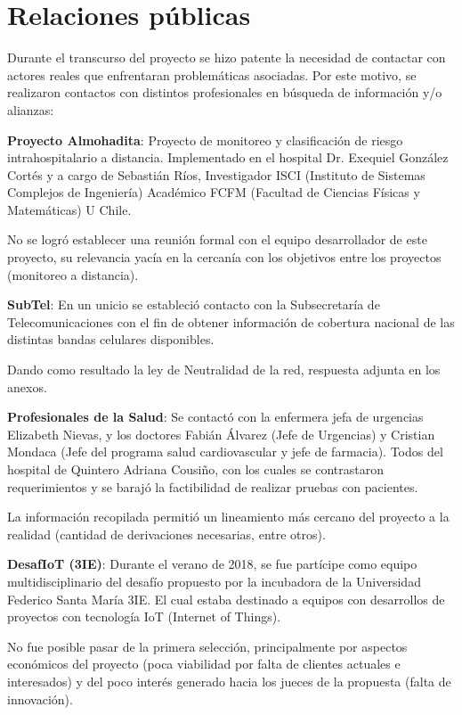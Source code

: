 \section{Relaciones públicas}

Durante el transcurso del proyecto se hizo patente la necesidad de contactar con actores reales que enfrentaran problemáticas asociadas. Por este motivo, se realizaron contactos con distintos profesionales en búsqueda de información y/o alianzas:

\textbf{Proyecto Almohadita}: Proyecto de monitoreo y clasificación de riesgo intrahospitalario a distancia. Implementado en el hospital Dr. Exequiel González Cortés y a cargo de Sebastián Ríos, Investigador ISCI (Instituto de Sistemas Complejos de Ingeniería) Académico FCFM (Facultad de Ciencias Físicas y Matemáticas) U Chile. 

No se logró establecer una reunión formal con el equipo desarrollador de este proyecto, su relevancia yacía en la cercanía con los objetivos entre los proyectos (monitoreo a distancia).

\textbf{SubTel}: En un unicio se estableció contacto con la Subsecretaría de Telecomunicaciones con el fin de obtener información de cobertura nacional de las distintas bandas celulares disponibles. 

Dando como resultado la ley de Neutralidad de la red, respuesta adjunta en los anexos.

\textbf{Profesionales de la Salud}: Se contactó con la enfermera jefa de urgencias Elizabeth Nievas, y los doctores Fabián Álvarez (Jefe de Urgencias) y Cristian Mondaca (Jefe del programa salud cardiovascular y jefe de farmacia). Todos del hospital de Quintero Adriana Cousiño, con los cuales se contrastaron requerimientos y se barajó la factibilidad de realizar pruebas con pacientes.

La información recopilada permitió un lineamiento más cercano del proyecto a la realidad (cantidad de derivaciones necesarias, entre otros).

\newpage

\textbf{DesafIoT (3IE)}: Durante el verano de 2018, se fue partícipe como equipo multidisciplinario del desafío propuesto por la incubadora de la Universidad Federico Santa María 3IE. El cual estaba destinado a equipos con desarrollos de proyectos con tecnología IoT (Internet of Things). 

No fue posible pasar de la primera selección, principalmente por aspectos económicos del proyecto (poca viabilidad por falta de clientes actuales e interesados) y del poco interés generado hacia los jueces de la propuesta (falta de innovación).

